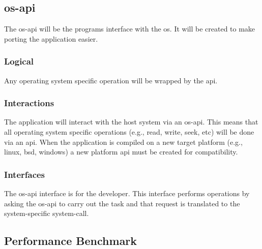 \subsection{\gls{os-api}}
\label{os-agnostic-api}

The \gls{os-api} will be the programs interface with the \gls{os}.
It will be created to make porting the application easier. 

\subsubsection{Logical}

Any operating system specific operation will be wrapped by the \gls{api}.

\subsubsection{Interactions}

The application will interact with the host system via an \gls{os-api}.
This means that all operating system specific operations (e.g., read, write, seek, etc) will be done via an \gls{api}.
When the application is compiled on a new target platform (e.g., \gls{linux}, \gls{bsd}, \gls{windows}) a new platform \gls{api} must be created for compatibility.

\subsubsection{Interfaces}

The \gls{os-api} interface is for the developer.
This interface performs operations by asking the \gls{os-api} to carry out the task and that request is translated to the system-specific system-call. 

\subsection{Performance Benchmark}
\label{performance-benchmark}

